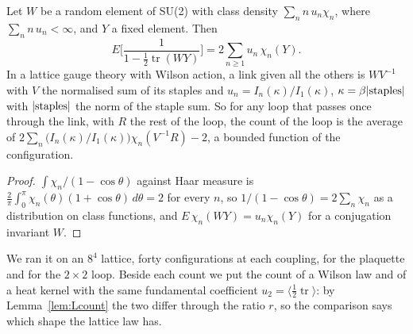 \begin{proposition}\label{prop:linkint}
Let $W$ be a random element of SU(2) with class density $\sum_nn\,u_n\chi_n$, where $\sum_nn\,u_n<\infty$, and $Y$ a fixed element. Then
\[
E\Big[\frac{1}{1-\frac12\operatorname{tr}(WY)}\Big]=2\sum_{n\ge1}u_n\,\chi_n(Y).
\]
In a lattice gauge theory with Wilson action, a link given all the others is $WV^{-1}$ with $V$ the normalised sum of its staples and $u_n=I_n(\kappa)/I_1(\kappa)$, $\kappa=\beta|{\rm staples}|$ with $|{\rm staples}|$ the norm of the staple sum. So for any loop that passes once through the link, with $R$ the rest of the loop, the count of the loop is the average of $2\sum_n\big(I_n(\kappa)/I_1(\kappa)\big)\chi_n(V^{-1}R)-2$, a bounded function of the configuration.
\end{proposition}

\begin{proof}
$\int\chi_n/(1-\cos\theta)$ against Haar measure is $\frac2\pi\int_0^\pi\chi_n(\theta)(1+\cos\theta)\,d\theta=2$ for every $n$, so $1/(1-\cos\theta)=2\sum_n\chi_n$ as a distribution on class functions, and $E\,\chi_n(WY)=u_n\chi_n(Y)$ for a conjugation invariant $W$.
\end{proof}

We ran it on an $8^4$ lattice, forty configurations at each coupling, for the plaquette and for the $2\times2$ loop. Beside each count we put the count of a Wilson law and of a heat kernel with the same fundamental coefficient $u_2=\langle\frac12\operatorname{tr}\rangle$: by Lemma~\ref{lem:Lcount} the two differ through the ratio $r$, so the comparison says which shape the lattice law has.

